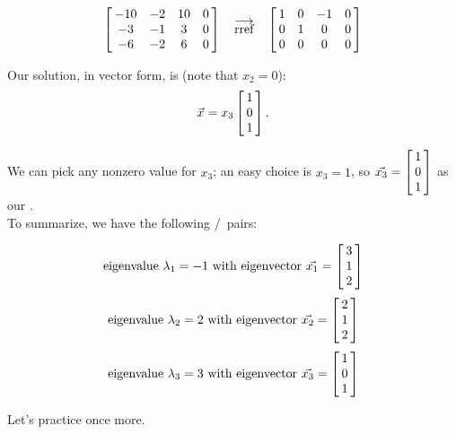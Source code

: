{$$\bmx{cccc} -10 & -2 & 10 &0\\ -3 & -1 & 3 & 0  \\ -6 & -2 & 6 & 0 \emx \quad \overrightarrow{\text{rref}} \quad \bmx{cccc} 1&0&-1&0\\0&1&0&0\\0&0&0&0\emx$$

Our solution, in vector form, is (note that $x_2 = 0$): $$\vx = x_3\bmx{c} 1\\0\\1\emx.$$

We can pick any nonzero value for $x_3$; an easy choice is $x_3 = 1$, so $\vx[3]=\bmx{c} 1\\0\\1\emx$ as our \ev.\\

\enlargethispage{\baselineskip}
To summarize, we have the following \el/\ev\ pairs: 

$$\text{\el\ } \lda_1=-1 \text{ with \ev\ } \vx[1] = \bmx{c}3\\1\\2\emx$$ 
$$\text{\el\ } \lda_2=2 \text{ with \ev\ } \vx[2] = \bmx{c}2\\1\\2\emx$$ 
$$\text{\el\ } \lda_3=3 \text{ with \ev\ } \vx[3] = \bmx{c}1\\0\\1\emx$$
}

Let's practice once more.\\

